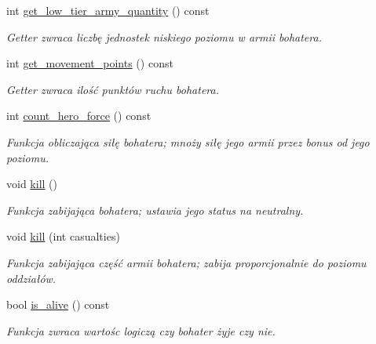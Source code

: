 \begin{DoxyCompactItemize}
int \hyperlink{classmodel_1_1Hero_a39aec53f854130463e7346d29e81f568}{get\+\_\+low\+\_\+tier\+\_\+army\+\_\+quantity} () const
\begin{DoxyCompactList}\small\item\em Getter zwraca liczbę jednostek niskiego poziomu w armii bohatera. \end{DoxyCompactList}\item 
\mbox{\label{classmodel_1_1Hero_a91f42678133f013bf1a4a98f99f850f9}} 
int \hyperlink{classmodel_1_1Hero_a91f42678133f013bf1a4a98f99f850f9}{get\+\_\+movement\+\_\+points} () const
\begin{DoxyCompactList}\small\item\em Getter zwraca ilość punktów ruchu bohatera. \end{DoxyCompactList}\item 
\mbox{\label{classmodel_1_1Hero_a14a9c842962a46c408060370cb8d2617}} 
int \hyperlink{classmodel_1_1Hero_a14a9c842962a46c408060370cb8d2617}{count\+\_\+hero\+\_\+force} () const
\begin{DoxyCompactList}\small\item\em Funkcja obliczająca siłę bohatera; mnoży siłę jego armii przez bonus od jego poziomu. \end{DoxyCompactList}\item 
\mbox{\label{classmodel_1_1Hero_a833bfd8bbf60219e9576bdb686a43e66}} 
void \hyperlink{classmodel_1_1Hero_a833bfd8bbf60219e9576bdb686a43e66}{kill} ()
\begin{DoxyCompactList}\small\item\em Funkcja zabijająca bohatera; ustawia jego status na neutralny. \end{DoxyCompactList}\item 
\mbox{\label{classmodel_1_1Hero_a3608f4f287ef07c12125c79cea171002}} 
void \hyperlink{classmodel_1_1Hero_a3608f4f287ef07c12125c79cea171002}{kill} (int casualties)
\begin{DoxyCompactList}\small\item\em Funkcja zabijająca część armii bohatera; zabija proporcjonalnie do poziomu oddziałów. \end{DoxyCompactList}\item 
\mbox{\label{classmodel_1_1Hero_a65710a95b0aeeb35431e42aad6f5e4df}} 
bool \hyperlink{classmodel_1_1Hero_a65710a95b0aeeb35431e42aad6f5e4df}{is\+\_\+alive} () const
\begin{DoxyCompactList}\small\item\em Funkcja zwraca wartośc logiczą czy bohater żyje czy nie. \end{DoxyCompactList}\end{DoxyCompactItemize}
